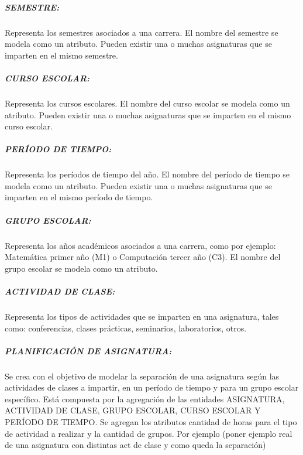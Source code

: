 \subparagraph{SEMESTRE:}
Representa los semestres asociados a una carrera. 
El nombre del semestre se modela como un atributo.
Pueden existir una o muchas asignaturas que se imparten en 
el mismo semestre. 

\subparagraph{CURSO ESCOLAR:}
Representa los cursos escolares.
El nombre del curso escolar se modela como un atributo.
Pueden existir una o muchas asignaturas que se imparten en 
el mismo curso escolar.


\subparagraph{PERÍODO DE TIEMPO:}
Representa los períodos de tiempo del año.
El nombre del período de tiempo se modela como un atributo.
Pueden existir una o muchas asignaturas que se imparten en 
el mismo período de tiempo.


\subparagraph{GRUPO ESCOLAR:}
Representa los años académicos asociados a una carrera, como por ejemplo:
Matemática primer año (M1) o Computación tercer año (C3).
El nombre del grupo escolar se modela como un atributo.

\subparagraph{ACTIVIDAD DE CLASE:}
Representa los tipos de actividades que se imparten en una asignatura, 
tales como: conferencias, clases prácticas, seminarios, laboratorios, otros. 

\subparagraph{PLANIFICACIÓN DE ASIGNATURA:}
Se crea con el objetivo de modelar la separación de una asignatura
según las actividades de clases a impartir, en un período de tiempo y para
un grupo escolar específico. Está compuesta por la agregación de las entidades ASIGNATURA, ACTIVIDAD DE CLASE, GRUPO 
ESCOLAR, CURSO ESCOLAR Y PERÍODO DE TIEMPO.
Se agregan los atributos cantidad de horas para el tipo de actividad a realizar y 
la cantidad de grupos.
Por ejemplo (poner ejemplo real de una asignatura
con distintas act de clase y como queda la separación)






